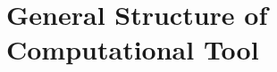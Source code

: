 \documentclass[../Dissertation]{subfiles}
\begin{document}
\section{General Structure of Computational Tool}

  
\end{document}
